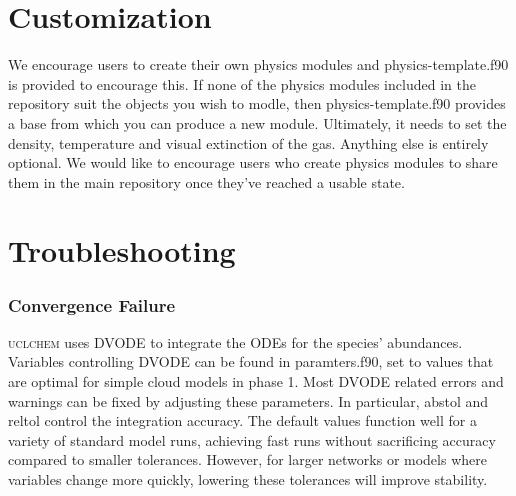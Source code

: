 \documentclass{llncs}
\begin{document}
\section{Customization}
We encourage users to create their own physics modules and physics-template.f90 is provided to encourage this. If none of the physics modules included in the repository suit the objects you wish to modle, then physics-template.f90 provides a base from which you can produce a new module. Ultimately, it needs to set the density, temperature and visual extinction of the gas. Anything else is entirely optional. We would like to encourage users who create physics modules to share them in the main repository once they've reached a usable state.

\section{Troubleshooting}
\label{sec:trouble}
\subsubsection{Convergence Failure}
\textsc{uclchem} uses DVODE to integrate the ODEs for the species' abundances. Variables controlling DVODE can be found in paramters.f90, set to values that are optimal for simple cloud models in phase 1. Most DVODE related errors and warnings can be fixed by adjusting these parameters. In particular, abstol and reltol control the integration accuracy. The default values function well for a variety of standard model runs, achieving fast runs without sacrificing accuracy compared to smaller tolerances. However, for larger networks or models where variables change more quickly, lowering these tolerances will improve stability.



\end{document}
